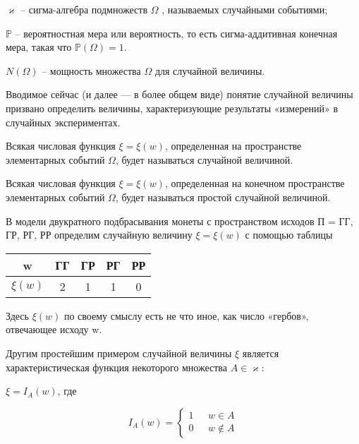 $\varkappa$ --  сигма-алгебра подмножеств 
$\Omega$ , называемых случайными событиями;

$\mathbb{P}$ -- вероятностная мера или вероятность, то есть сигма-аддитивная конечная мера, такая что
$\mathbb{P}(\Omega) = 1.$

$N(\Omega)$ -- мощность множества $\Omega$ для случайной величины.

Вводимое сейчас (и далее — в более общем виде) понятие случайной величины призвано определить величины, характеризующие результаты «измерений» в случайных экспериментах.

\begin{definition}\label{poleshko_def_1} Всякая числовая функция $\xi = \xi(w)$, определенная на пространстве элементарных событий $\Omega$, будет называться случайной величиной.
	\end{definition}

\begin{definition}\label{poleshko_def_2} Всякая числовая функция $\xi = \xi(w)$, определенная на конечном пространстве элементарных событий $\Omega$, будет называться простой случайной величиной.
	\end{definition}

\begin{example} В модели двукратного подбрасывания монеты с пространством исходов П = {ГГ, ГР, РГ, РР} определим случайную величину $\xi = \xi(w)$ с помощью таблицы

\begin{center}
\begin{tabular}{ | c | c | c | c | c |}
\hline
w & ГГ & ГР  & РГ & РР\\ \hline
$\xi(w)$ & 2 & 1  & 1 & 0\\ \hline
 \end{tabular}
\end {center}

Здесь $\xi(w)$ по своему смыслу есть не что иное, как число «гербов», отвечающее исходу w.
\end{example}

Другим простейшим примером случайной величины $\xi$ является характеристическая функция некоторого множества $A \in \varkappa$:

\begin{center}

$\xi = I_A(w)$, где

\begin{equation*}
I_A(w) = 
 \begin{cases}
   1 &\text{ $w\in A$}\\
   0 &\text{ $w \notin A$}
 \end{cases}
\end{equation*}

\end{center}

